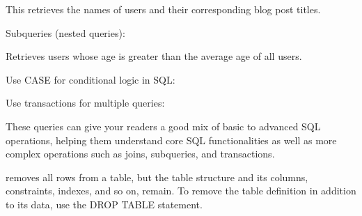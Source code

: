 

This retrieves the names of users and their corresponding blog post titles.

Subqueries (nested queries):



Retrieves users whose age is greater than the average age of all users.

Use {CASE for conditional} logic in SQL:



Use transactions for multiple queries:



These queries can give your readers a good mix of basic to advanced SQL operations, 
helping them understand core SQL functionalities as well as more complex operations such as joins,
 subqueries, and transactions.


 removes all rows from a table, but the table structure and its columns, constraints, indexes, and so on, remain. 
 To remove the table definition in addition to its data, use the DROP TABLE statement.